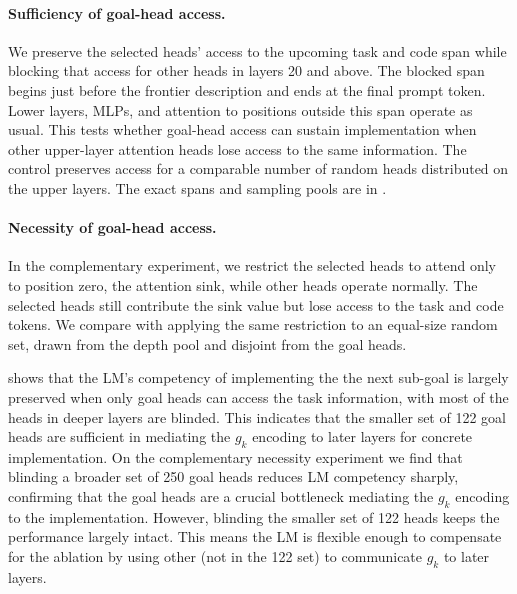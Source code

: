 \paragraph{Sufficiency of goal-head access.}
We preserve the selected heads' access to the upcoming task and code span while blocking that access for other heads in layers 20 and above. The blocked span begins just before the frontier description and ends at the final prompt token. Lower layers, MLPs, and attention to positions outside this span operate as usual. This tests whether goal-head access can sustain implementation when other upper-layer attention heads lose access to the same information. The control preserves access for a comparable number of random heads distributed on the upper layers. The exact spans and sampling pools are in .

\paragraph{Necessity of goal-head access.}
\label{sec:mechanism:necessity}
In the complementary experiment, we restrict the selected heads to attend only to position zero, the attention sink, while other heads operate normally. The selected heads still contribute the sink value but lose access to the task and code tokens. We compare with applying the same restriction to an equal-size random set, drawn from the depth pool and disjoint from the goal heads.



 shows that the LM's competency of implementing the the next sub-goal is largely preserved when only goal heads can access the task information, with most of the heads in deeper layers are blinded. This indicates that the smaller set of 122 goal heads are sufficient in mediating the $g_k$ encoding to later layers for concrete implementation. On the complementary necessity experiment we find that blinding a broader set of 250 goal heads reduces LM competency sharply, confirming that the goal heads are a crucial bottleneck mediating the $g_k$ encoding to the implementation. However, blinding the smaller set of 122 heads keeps the performance largely intact. This means the LM is flexible enough to compensate for the ablation by using other \goalheads (not in the 122 set) to communicate $g_k$ to later layers.


